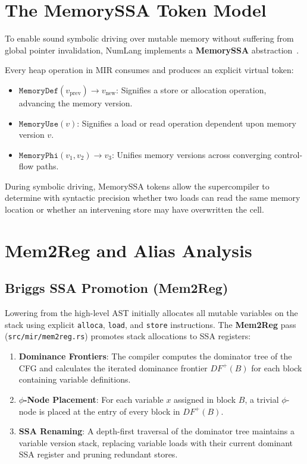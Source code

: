 \section{The MemorySSA Token Model}
\label{sec:ir:memory_ssa}

To enable sound symbolic driving over mutable memory without suffering from global pointer invalidation, NumLang implements a \textbf{MemorySSA} abstraction~\cite{briggs1998effective}.

Every heap operation in MIR consumes and produces an explicit virtual token:
\begin{itemize}
    \item $\mathtt{MemoryDef}(v_{\text{prev}}) \to v_{\text{new}}$: Signifies a store or allocation operation, advancing the memory version.
    \item $\mathtt{MemoryUse}(v)$: Signifies a load or read operation dependent upon memory version $v$.
    \item $\mathtt{MemoryPhi}(v_1, v_2) \to v_3$: Unifies memory versions across converging control-flow paths.
\end{itemize}

During symbolic driving, MemorySSA tokens allow the supercompiler to determine with syntactic precision whether two loads can read the same memory location or whether an intervening store may have overwritten the cell.

\section{Mem2Reg and Alias Analysis}
\label{sec:ir:mem2reg_alias}

\subsection{Briggs SSA Promotion (Mem2Reg)}
Lowering from the high-level AST initially allocates all mutable variables on the stack using explicit \texttt{alloca}, \texttt{load}, and \texttt{store} instructions. The \textbf{Mem2Reg} pass (\texttt{src/mir/mem2reg.rs}) promotes stack allocations to SSA registers:
\begin{enumerate}
    \item \textbf{Dominance Frontiers}: The compiler computes the dominator tree of the CFG and calculates the iterated dominance frontier $DF^+(B)$ for each block containing variable definitions.
    \item \textbf{$\phi$-Node Placement}: For each variable $x$ assigned in block $B$, a trivial $\phi$-node is placed at the entry of every block in $DF^+(B)$.
    \item \textbf{SSA Renaming}: A depth-first traversal of the dominator tree maintains a variable version stack, replacing variable loads with their current dominant SSA register and pruning redundant stores.
\end{enumerate}

